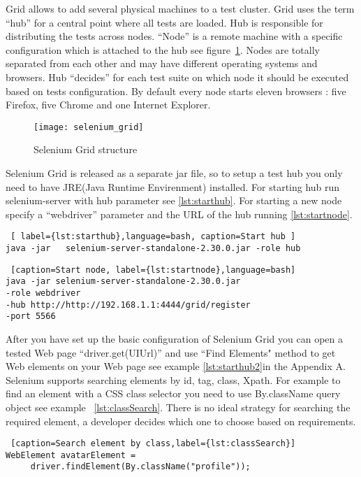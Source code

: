 Grid allows to add several physical machines to a test cluster. Grid uses the
term ``hub'' for a central point where all tests are loaded. Hub is responsible
for distributing the tests across nodes. ``Node'' is  a remote machine with
a specific configuration which is attached to the hub see
figure~\ref{fig:selnium_grid}. Nodes are totally separated from each other and
may have different operating systems and browsers. Hub ``decides''
for each test suite on which node it should be executed based on tests configuration.
By default every node starts eleven browsers : five Firefox, five Chrome and
one Internet Explorer.
		
\begin{figure}
\centering
\texttt{[image: selenium\_grid]}
\caption{Selenium Grid structure}
\label{fig:selnium_grid}
\end{figure}

Selenium Grid is released as a separate jar file, so to setup a test hub you
only need to have JRE(Java Runtime Envirenment) installed. For starting hub
run selenium-server with hub parameter see \ref{lst:starthub}. For starting
a new node specify a ``webdriver'' parameter and the URL of the hub running
\ref{lst:startnode}.
		
\lstset{style=console}
\begin{lstlisting} [ label={lst:starthub},language=bash, caption=Start hub ]
java -jar	selenium-server-standalone-2.30.0.jar -role hub
\end{lstlisting}

    \lstset{style=console}
\begin{lstlisting} [caption=Start node, label={lst:startnode},language=bash]
java -jar selenium-server-standalone-2.30.0.jar 
-role webdriver
-hub http://http://192.168.1.1:4444/grid/register
-port 5566
\end{lstlisting}
		

	After you have set up the basic configuration of Selenium Grid you can open a
	tested Web page ``driver.get(UIUrl)'' and use ``Find
	Elements" method to get Web elements on your Web page see example
	\ref{lst:starthub2}in the Appendix A. 
	 Selenium  supports searching elements by id, tag, class, Xpath.
	 For example to find an element with a CSS class selector you need
	 to use By.className query object see example ~\ref{lst:classSearch}. There is no
	  ideal strategy for searching the required element, a developer
	decides which one to choose based on requirements.
	
	\lstset{style=a1listing}
	\begin{lstlisting} [caption=Search element by class,label={lst:classSearch}]
WebElement avatarElement = 
	 driver.findElement(By.className("profile"));
	\end{lstlisting}